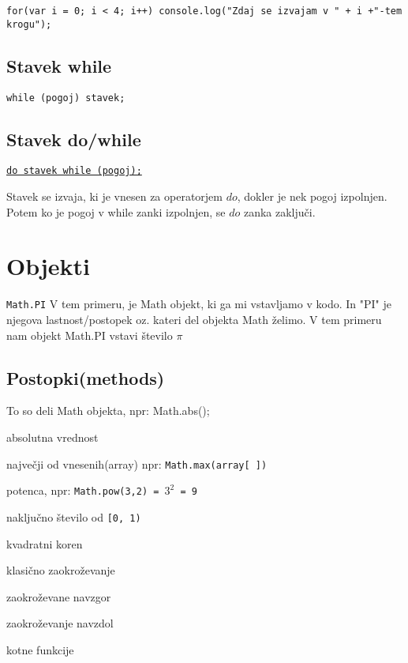 \begin{verbatim}
for(var i = 0; i < 4; i++) console.log("Zdaj se izvajam v " + i +"-tem krogu");
\end{verbatim}

\subsection{Stavek while}

\texttt{while (pogoj) stavek;}
\newpage

\subsection{Stavek do/while}

\underline{\texttt{do stavek while (pogoj);}}

Stavek se izvaja, ki je vnesen za operatorjem $do$, dokler je nek pogoj izpolnjen. Potem ko je pogoj v while zanki izpolnjen, se $do$ zanka zaključi.
\section{Objekti}

\texttt{Math.PI}
V tem primeru, je Math objekt, ki ga mi vstavljamo v kodo. In "PI" je njegova lastnost/postopek oz. kateri del objekta Math želimo. V tem primeru nam objekt Math.PI vstavi število $\pi$


\subsection{Postopki(methods)}
To so deli Math objekta, npr: Math.abs();
\begin{description}[align=left, labelwidth=2cm]
	\item[abs()] absolutna vrednost
	\item[max()] največji od vnesenih(array) npr: \texttt{Math.max(array[ ])}
	\item[pow()] potenca, npr: \texttt{Math.pow(3,2) = $3^2$ = 9}
	
	\item[random()] naključno število od \texttt{[0, 1)}
	\item[sqrt()] kvadratni koren
	\item[round()] klasično zaokroževanje
	\item[ceil()] zaokroževane navzgor
	\item[floor()] zaokroževanje navzdol
	\item[sin(), cos(), tan()] kotne funkcije
\end{description}

